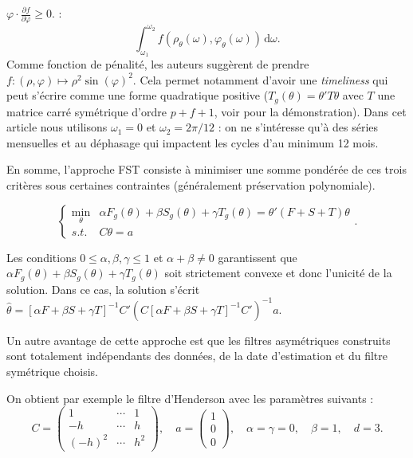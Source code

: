 \documentclass[
  11pt,
  french,
  a4paper]{article}
\newcommand\1{\mathds{1}}
\newcommand\ud{\,\mathrm{d}}
\begin{document}
\begin{itemize}
{    \(\varphi \cdot \frac{\partial f}{\partial \varphi} \geq 0\).} :
  \[
  \int_{\omega_{1}}^{\omega_{2}}f(\rho_{\theta}(\omega),\varphi_{\theta}(\omega))\ud\omega.
  \]
  Comme fonction de pénalité, les auteurs suggèrent de prendre \(f\colon(\rho,\varphi)\mapsto\rho^2\sin(\varphi)^2\).
  Cela permet notamment d'avoir une \emph{timeliness} qui peut s'écrire comme une forme quadratique positive (\(T_g(\theta)=\theta'T\theta\) avec \(T\) une matrice carré symétrique d'ordre \(p+f+1\), voir \textcite{ch15HBSA} pour la démonstration).
  Dans cet article nous utilisons \(\omega_1=0\) et \(\omega_2=2\pi/12\) : on ne s'intéresse qu'à des séries mensuelles et au déphasage qui impactent les cycles d'au minimum 12 mois.
\end{itemize}

En somme, l'approche FST consiste à minimiser une somme pondérée de ces trois critères sous certaines contraintes (généralement préservation polynomiale).

\begin{equation}
\begin{cases}
\underset{\theta}{\min} &
\alpha F_g(\theta)+\beta S_g(\theta)+\gamma T_g(\theta) = \theta'(F+S+T)\theta\\
s.t. & C\theta=a
\end{cases}. \label{eq:gugemmos}
\end{equation}

Les conditions \(0\leq\alpha,\beta,\gamma\leq 1\) et \(\alpha+\beta\ne0\) garantissent que \(\alpha F_g(\theta)+\beta S_g(\theta)+\gamma T_g(\theta)\) soit strictement convexe et donc l'unicité de la solution.
Dans ce cas, la solution s'écrit \(\hat \theta = [\alpha F+\beta S+ \gamma T]^{-1}C'\left(C[\alpha F+\beta S+ \gamma T]^{-1}C'\right)^{-1}a\).

Un autre avantage de cette approche est que les filtres asymétriques construits sont totalement indépendants des données, de la date d'estimation et du filtre symétrique choisis.

On obtient par exemple le filtre d'Henderson avec les paramètres suivants :
\[C=\begin{pmatrix}
1 & \cdots&1\\
-h & \cdots&h \\
(-h)^2 & \cdots&h^2
\end{pmatrix},\quad
a=\begin{pmatrix}
1 \\0\\0
\end{pmatrix},\quad
\alpha=\gamma=0,\quad
\beta=1,\quad d=3.\]
\end{document}

